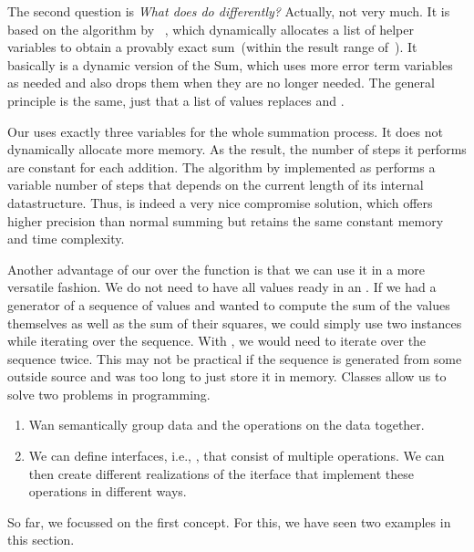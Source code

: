 The second question is \emph{What does  do differently?}
Actually, not very much.
It is based on the algorithm by \citeauthor{S1997APFPAAFRGP}~\cite{S1997APFPAAFRGP,H2005BFPSATFPPR}, which dynamically allocates a list of helper variables to obtain a provably exact sum~(within the result range of~).
It basically is a dynamic version of the \citeauthor{K1965PFRORTE} Sum, which uses more error term variables as needed and also drops them when they are no longer needed.
The general principle is the same, just that a list of values replaces  and .

Our  uses exactly three variables for the whole summation process.
It does not dynamically allocate more memory.
As the result, the number of steps it performs are constant for each addition.
The algorithm by \citeauthor{S1997APFPAAFRGP} implemented as  performs a variable number of steps that depends on the current length of its internal datastructure.
Thus,  is indeed a very nice compromise solution, which offers higher precision than normal summing but retains the same constant memory and time complexity.

Another advantage of our  over the function  is that we can use it in a more versatile fashion.
We do not need to have all values ready in an .
If we had a generator of a sequence of values and wanted to compute the sum of the values themselves as well as the sum of their squares, we could simply use two instances  while iterating over the sequence.
With , we would need to iterate over the sequence twice.
This may not be practical if the sequence is generated from some outside source and was too long to just store it in memory.%
%
\endhsection%
%
%
Classes allow us to solve two problems in programming.%
%
\begin{enumerate}%
\item Wan semantically group data and the operations on the data together.%
\item We can define interfaces, i.e., , that consist of multiple operations. %
We can then create different realizations of the iterface that implement these operations in different ways.%
\end{enumerate}%
%
So far, we focussed on the first concept.
For this, we have seen two examples in this section.


